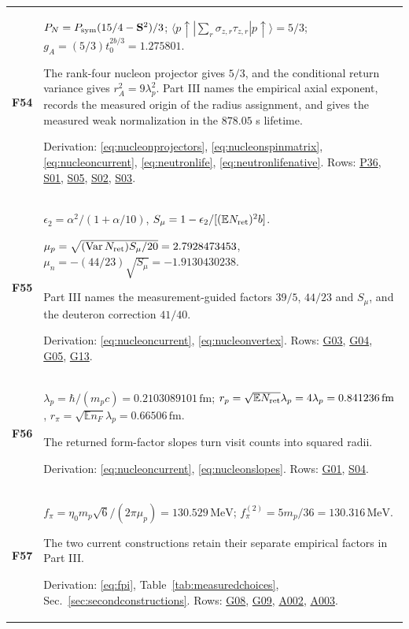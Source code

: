\documentclass[aps,prx,onecolumn,10pt,notitlepage,nofootinbib,longbibliography]{revtex4-2}
\numberwithin{equation}{section}
\numberwithin{table}{section}
\newcommand{\EE}{\mathbb E}
\newcommand{\Var}{\operatorname{Var}}
\newcommand{\MeV}{\,\mathrm{MeV}}
\newcommand{\fm}{\,\mathrm{fm}}
\begin{document}
\begin{longtable}{@{}>{\raggedright\arraybackslash}p{}>{\raggedright\arraybackslash}p{}@{}}
\hypertarget{formula-F54}{}\textbf{F54}\label{formula:F54} & $P_N=P_{\rm sym}(15/4-\mathbf S^2)/3$; $\langle p\uparrow|\sum_r\sigma_{z,r}\tau_{z,r}|p\uparrow\rangle=5/3$; $g_A=(5/3)t_0^{2b/3}=1.275801$.\par
The rank-four nucleon projector gives $5/3$, and the conditional return variance gives $r_A^2=9\lambda_p^2$. Part III names the empirical axial exponent, records the measured origin of the radius assignment, and gives the measured weak normalization in the $878.05$ s lifetime.\par
Derivation: \eqref{eq:nucleonprojectors}, \eqref{eq:nucleonspinmatrix}, \eqref{eq:nucleoncurrent}, \eqref{eq:neutronlife}, \eqref{eq:neutronlifenative}. Rows: \hyperlink{row-P36}{P36}, \hyperlink{row-S01}{S01}, \hyperlink{row-S05}{S05}, \hyperlink{row-S02}{S02}, \hyperlink{row-S03}{S03}.\\[7pt]
\hypertarget{formula-F55}{}\textbf{F55}\label{formula:F55} & $\epsilon_2=\alpha^2/(1+\alpha/10)$, $S_\mu=1-\epsilon_2/[(\EE N_{\rm ret})^2b]$.\par $\mu_p=\sqrt{(\Var N_{\rm ret})S_\mu/20}=2.7928473453$, $\mu_n=-(44/23)\sqrt{S_\mu}=-1.9130430238$.\par
Part III names the measurement-guided factors $39/5$, $44/23$ and $S_\mu$, and the deuteron correction $41/40$.\par
Derivation: \eqref{eq:nucleoncurrent}, \eqref{eq:nucleonvertex}. Rows: \hyperlink{row-G03}{G03}, \hyperlink{row-G04}{G04}, \hyperlink{row-G05}{G05}, \hyperlink{row-G13}{G13}.\\[7pt]
\hypertarget{formula-F56}{}\textbf{F56}\label{formula:F56} & $\lambda_p=\hbar/(m_pc)=0.2103089101\fm$; $r_p=\sqrt{\EE N_{\rm ret}}\lambda_p=4\lambda_p=0.841236\fm$, $r_\pi=\sqrt{\EE n_F}\lambda_p=0.66506\fm$.\par
The returned form-factor slopes turn visit counts into squared radii.\par
Derivation: \eqref{eq:nucleoncurrent}, \eqref{eq:nucleonslopes}. Rows: \hyperlink{row-G01}{G01}, \hyperlink{row-S04}{S04}.\\[7pt]
\hypertarget{formula-F57}{}\textbf{F57}\label{formula:F57} & $f_\pi=\eta_0m_p\sqrt6/(2\pi\mu_p)=130.529\MeV$; $f_\pi^{(2)}=5m_p/36=130.316\MeV$.\par
The two current constructions retain their separate empirical factors in Part III.\par
Derivation: \eqref{eq:fpi}, Table~\ref{tab:measuredchoices}, Sec.~\ref{sec:secondconstructions}. Rows: \hyperlink{row-G08}{G08}, \hyperlink{row-G09}{G09}, \hyperlink{row-A002}{A002}, \hyperlink{row-A003}{A003}.\\[7pt]

\end{longtable}
\end{document}
